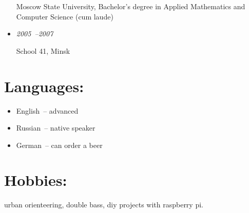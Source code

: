 \documentclass{res}
\begin{document}
\begin{resume}
\begin{itemize}
              Moscow State University, Bachelor's degree in Applied Mathematics and Computer Science (cum laude)

            \item \textit{2005~--2007}

             School 41, Minsk
        \end{itemize}

    \section{Languages:}
        \begin{itemize}
            \item English~-- advanced
            \item Russian~-- native speaker
            \item German~-- can order a beer
        \end{itemize}


    \section{Hobbies:} urban orienteering, double bass, diy projects with raspberry pi.
\end{resume}
\end{document}
